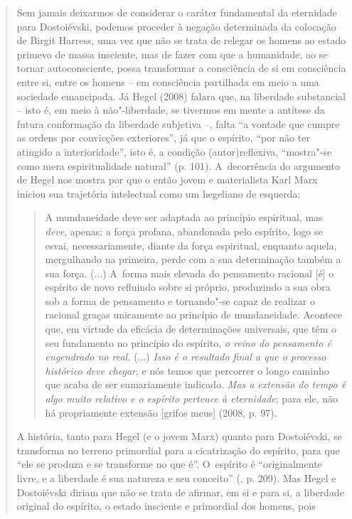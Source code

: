 {\begin{quote}
Sem jamais deixarmos de considerar o caráter fundamental da eternidade
para Dostoiévski, podemos proceder à negação determinada da colocação de
Birgit Harress, uma vez que não se trata de relegar os homens ao estado
primevo de massa insciente, mas de fazer com que a humanidade, ao se
tornar autoconsciente, possa transformar a consciência de si em
consciência entre si, entre os homens -- em consciência partilhada em
meio a uma sociedade emancipada. Já Hegel (2008) falara que, na
liberdade substancial -- isto é, em meio à não"-liberdade, se tivermos em
mente a antítese da futura conformação da liberdade subjetiva --, falta
``a vontade que cumpre as ordens por convicções exteriores'', já que o
espírito, ``por não ter atingido a interioridade'', isto é, a condição
(autor)reflexiva, ``mostra"-se como mera espiritualidade natural'' (p.
101). A~decorrência do argumento de Hegel nos mostra por que o então
jovem e materialista Karl Marx iniciou sua trajetória intelectual como
um hegeliano de esquerda:

\begin{quote}
A mundaneidade deve ser adaptada ao princípio espiritual, mas
\emph{deve}, apenas: a força profana, abandonada pelo espírito, logo se
esvai, necessariamente, diante da força espiritual, enquanto aquela,
mergulhando na primeira, perde com a sua determinação também a sua
força. (...) A~forma mais elevada do pensamento racional {[}é{]} o
espírito de novo refluindo sobre si próprio, produzindo a sua obra sob a
forma de pensamento e tornando"-se capaz de realizar o racional graças
unicamente ao princípio de mundaneidade. Acontece que, em virtude da
eficácia de determinações universais, que têm o seu fundamento no
princípio do espírito, \emph{o reino do pensamento é engendrado no
real.} (...) \emph{Isso é o resultado final a que o processo histórico
deve chegar}, e nós temos que percorrer o longo caminho que acaba de ser
sumariamente indicado. \emph{Mas a extensão do tempo é algo muito
relativo e o espírito pertence à eternidade}; para ele, não há
propriamente extensão {[}grifos meus{]} (2008, p. 97).
\end{quote}

A história, tanto para Hegel (e o jovem Marx) quanto para Dostoiévski,
se transforma no terreno primordial para a cicatrização do espírito,
para que ``ele se produza e se transforme no que é''. O~espírito é
``originalmente livre, e a liberdade é sua natureza e seu conceito''
(, p. 209). Mas Hegel e Dostoiévski diriam que não se trata de
afirmar, em si e para si, a liberdade original do espírito, o estado
insciente e primordial dos homens, pois


\end{quote}}
